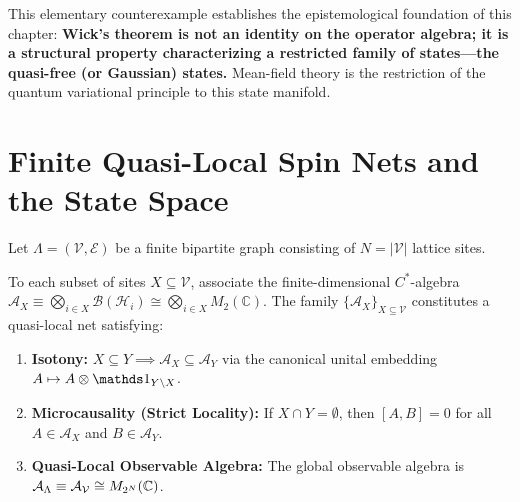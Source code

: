 This elementary counterexample establishes the epistemological foundation of this chapter: \textbf{Wick's theorem is not an identity on the operator algebra; it is a structural property characterizing a restricted family of states---the quasi-free (or Gaussian) states.} Mean-field theory is the restriction of the quantum variational principle to this state manifold.

\section{Finite Quasi-Local Spin Nets and the State Space}
\label{sec:m1_1b_aqft_spin_nets}
Let $\Lambda = (\mathcal{V}, \mathcal{E})$ be a finite bipartite graph consisting of $N = |\mathcal{V}|$ lattice sites.

\begin{definition}
\label{def:m1_1b_spin_net}
To each subset of sites $X \subseteq \mathcal{V}$, associate the finite-dimensional $C^*$-algebra $\mathcal{A}_X \equiv \bigotimes_{i \in X} \mathcal{B}(\mathcal{H}_i) \cong \bigotimes_{i \in X} M_2(\mathbb{C})$. The family $\{\mathcal{A}_X\}_{X \subseteq \mathcal{V}}$ constitutes a quasi-local net satisfying:
\begin{enumerate}
\item \textbf{Isotony:} $X \subseteq Y \implies \mathcal{A}_X \subseteq \mathcal{A}_Y$ via the canonical unital embedding $A \mapsto A \otimes \Id_{Y \setminus X}$.
\item \textbf{Microcausality (Strict Locality):} If $X \cap Y = \emptyset$, then $[A, B] = 0$ for all $A \in \mathcal{A}_X$ and $B \in \mathcal{A}_Y$.
\item \textbf{Quasi-Local Observable Algebra:} The global observable algebra is $\mathcal{A}_{\Lambda} \equiv \mathcal{A}_{\mathcal{V}} \cong M_{2^N}(\mathbb{C})$.
\end{enumerate}
\end{definition}

